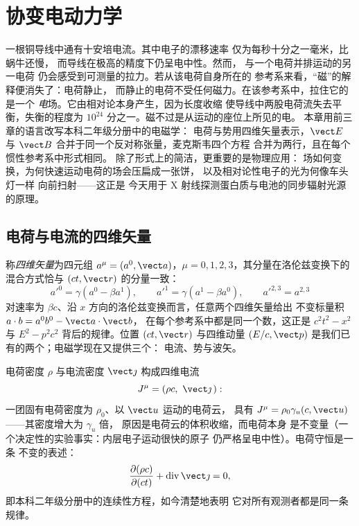 \chapter{协变电动力学}\label{ch:b3:covariant-electromagnetism}

一根铜导线中通有十安培电流。其中电子的漂移速率
仅为每秒十分之一毫米，比蜗牛还慢，
而导线在极高的精度下仍呈电中性。然而，
与一个电荷并排运动的另一电荷
仍会感受到可测量的拉力。若从该电荷自身所在的
参考系来看，“磁”的解释便消失了：电荷静止，
而静止的电荷不受任何磁力。在该参考系中，拉住它的是一个
\emph{电}场。它由相对论本身产生，因为长度收缩
使导线中两股电荷流失去平衡，失衡的程度为
$10^{24}$ 分之一。磁不过是从运动的座位上所见的电。
本章用前三章的语言改写本科二年级分册中的电磁学：
电荷与势用四维矢量表示，$\vect E$ 与 $\vect B$
合并于同一个反对称张量，麦克斯韦四个方程
合并为两行，且在每个惯性参考系中形式相同。
除了形式上的简洁，更重要的是物理应用：
场如何变换，为何快速运动电荷的场会压扁成一张饼，
以及相对论性电子的光为何像车头灯一样
向前扫射——这正是
今天用于 X 射线探测蛋白质与电池的同步辐射光源的原理。

\section{电荷与电流的四维矢量}

\begin{definition}[四维矢量]\label{def:b3:covariant-electromagnetism:fourvector}
称\emph{四维矢量}为四元组 $a^\mu = (a^0, \vect a)$，$\mu =
0, 1, 2, 3$，其分量在洛伦兹变换下的混合方式恰与 $(ct,
\vect r)$ 的分量一致：
\[
a'^0 = \gamma(a^0 - \beta a^1) , \qquad
a'^1 = \gamma(a^1 - \beta a^0) , \qquad
a'^{2,3} = a^{2,3}
\]
对速率为 $\beta c$、沿 $x$ 方向的洛伦兹变换而言，任意两个四维矢量给出
不变标量积 $a\cdot b = a^0b^0 - \vect a\cdot\vect b$，
在每个参考系中都是同一个数，这正是 $c^2t^2 - x^2$
与 $E^2 - p^2c^2$ 背后的规律。位置 $(ct, \vect r)$ 与四维动量
$(E/c, \vect p)$ 是我们已有的两个；电磁学现在又提供三个：
电流、势与波矢。
\end{definition}

\begin{proposition}[四维电流与电荷守恒]\label{prop:b3:covariant-electromagnetism:fourcurrent}
电荷密度 $\rho$ 与电流密度 $\vect\jmath$
构成四维电流
\[
J^\mu = (\rho c,\ \vect\jmath\,) :
\]
一团固有电荷密度为 $\rho_0$、以 $\vect u$ 运动的电荷云，
具有 $J^\mu = \rho_0\gamma_u(c, \vect u)$——其密度增大为 $\gamma_u$ 倍，
原因是电荷云的体积收缩，而电荷本身
是不变量（一个决定性的实验事实：内层电子运动很快的原子
仍严格呈电中性）。电荷守恒是一条
不变的表述：
\[
\frac{\partial(\rho c)}{\partial(ct)} +
\operatorname{div}\vect\jmath = 0 ,
\]
即本科二年级分册中的连续性方程，如今清楚地表明
它对所有观测者都是同一条规律。
\end{proposition}

